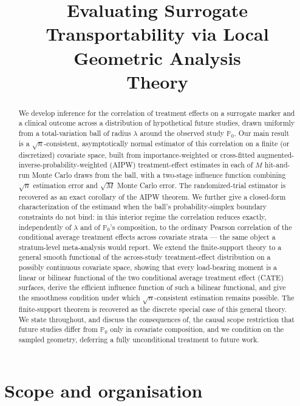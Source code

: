 \documentclass[11pt]{article}
\title{Evaluating Surrogate Transportability via Local Geometric Analysis\\[2pt]
\large Theory}
\author{}
\date{}
\theoremstyle{plain}
\theoremstyle{definition}
\theoremstyle{remark}
\newcommand{\PP}{\mathbb{P}}
\begin{document}
\maketitle

\begin{abstract}
We develop inference for the correlation of treatment effects on a surrogate marker
and a clinical outcome across a distribution of hypothetical future studies, drawn
uniformly from a total-variation ball of radius $\lambda$ around the observed study
$\PP_0$. Our main result is a $\sqrt n$-consistent, asymptotically normal estimator of
this correlation on a finite (or discretized) covariate space, built from
importance-weighted or cross-fitted augmented-inverse-probability-weighted (AIPW)
treatment-effect estimates in each of $M$ hit-and-run Monte Carlo draws from the ball,
with a two-stage influence function combining $\sqrt n$ estimation error and
$\sqrt M$ Monte Carlo error. The randomized-trial estimator is recovered as an exact
corollary of the AIPW theorem. We further give a closed-form characterization of the
estimand when the ball's probability-simplex boundary constraints do not bind: in this
interior regime the correlation reduces exactly, independently of $\lambda$ and of
$\PP_0$'s composition, to the ordinary Pearson correlation of the conditional average
treatment effects across covariate strata --- the same object a stratum-level
meta-analysis would report. We extend the finite-support theory to a general smooth
functional of the across-study treatment-effect distribution on a possibly continuous
covariate space, showing that every load-bearing moment is a linear or bilinear
functional of the two conditional average treatment effect (CATE) surfaces, derive the
efficient influence function of such a bilinear functional, and give the smoothness
condition under which $\sqrt n$-consistent estimation remains possible. The
finite-support theorem is recovered as the discrete special case of this general
theory. We state throughout, and discuss the consequences of, the causal scope
restriction that future studies differ from $\PP_0$ only in covariate composition, and
we condition on the sampled geometry, deferring a fully unconditional treatment to
future work.
\end{abstract}

\tableofcontents

\section{Scope and organisation}\label{sec:scope}
\end{document}
